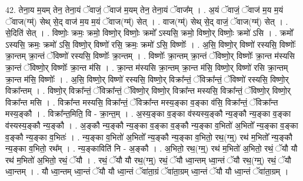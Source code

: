 \documentclass[17pt]{extarticle}
\begin{document}
42. तेना॒य म॒यम् तेन॒ तेना॒यं ॅवाजं॒ ॅवाज॑ म॒यम् तेन॒ तेना॒यं ॅवाज᳚म् । . अ॒यं ॅवाजं॒ ॅवाज॑ म॒य म॒यं ॅवाज(ग्म्॑) सेथ् से॒द् वाज॑ म॒य म॒यं ॅवाज(ग्म्॑) सेत् । . वाज(ग्म्॑) सेथ् से॒द् वाजं॒ ॅवाज(ग्म्॑) सेत् । . से॒दिति॑ सेत् । . विष्णोः॒ क्रमः॒ क्रमो॒ विष्णो॒र् विष्णोः॒ क्रमो᳚ ऽस्यसि॒ क्रमो॒ विष्णो॒र् विष्णोः॒ क्रमो॑ ऽसि । . क्रमो᳚ ऽस्यसि॒ क्रमः॒ क्रमो॑ ऽसि॒ विष्णो॒र् विष्णो॑ रसि॒ क्रमः॒ क्रमो॑ ऽसि॒ विष्णोः᳚ । . अ॒सि॒ विष्णो॒र् विष्णो॑ रस्यसि॒ विष्णोः᳚ क्रा॒न्तम् क्रा॒न्तं ॅविष्णो॑ रस्यसि॒ विष्णोः᳚ क्रा॒न्तम् । . विष्णोः᳚ क्रा॒न्तम् क्रा॒न्तं ॅविष्णो॒र् विष्णोः᳚ क्रा॒न्त म॑स्यसि क्रा॒न्तं ॅविष्णो॒र् विष्णोः᳚ क्रा॒न्त म॑सि । . क्रा॒न्त म॑स्यसि क्रा॒न्तम् क्रा॒न्त म॑सि॒ विष्णो॒र् विष्णो॑ रसि क्रा॒न्तम् क्रा॒न्त म॑सि॒ विष्णोः᳚ । . अ॒सि॒ विष्णो॒र् विष्णो॑ रस्यसि॒ विष्णो॒र् विक्रा᳚न्तं॒ ॅविक्रा᳚न्तं॒ ॅविष्णो॑ रस्यसि॒ विष्णो॒र् विक्रा᳚न्तम् । . विष्णो॒र् विक्रा᳚न्तं॒ ॅविक्रा᳚न्तं॒ ॅविष्णो॒र् विष्णो॒र् विक्रा᳚न्त मस्यसि॒ विक्रा᳚न्तं॒ ॅविष्णो॒र् विष्णो॒र् विक्रा᳚न्त मसि । . विक्रा᳚न्त मस्यसि॒ विक्रा᳚न्तं॒ ॅविक्रा᳚न्त मस्य॒ङ्का व॒ङ्का व॑सि॒ विक्रा᳚न्तं॒ ॅविक्रा᳚न्त मस्य॒ङ्कौ । . विक्रा᳚न्त॒मिति॒ वि - क्रा॒न्त॒म् । . अ॒स्य॒ङ्का व॒ङ्का व॑स्यस्य॒ङ्कौ न्य॒ङ्कौ न्य॒ङ्का व॒ङ्का व॑स्यस्य॒ङ्कौ न्य॒ङ्कौ । . अ॒ङ्कौ न्य॒ङ्कौ न्य॒ङ्का व॒ङ्का व॒ङ्कौ न्य॒ङ्का व॒भितो॑ अ॒भितो᳚ न्य॒ङ्का व॒ङ्का व॒ङ्कौ न्य॒ङ्का व॒भितः॑ । . न्य॒ङ्का व॒भितो॑ अ॒भितो᳚ न्य॒ङ्कौ न्य॒ङ्का व॒भितो॒ रथ॒(ग्म्॒) रथ॑ म॒भितो᳚ न्य॒ङ्कौ न्य॒ङ्का व॒भितो॒ रथ᳚म् । . न्य॒ङ्काविति॑ नि - अ॒ङ्कौ । . अ॒भितो॒ रथ॒(ग्म्॒) रथ॑ म॒भितो॑ अ॒भितो॒ रथं॒ ॅयौ यौ रथ॑ म॒भितो॑ अ॒भितो॒ रथं॒ ॅयौ । . रथं॒ ॅयौ यौ रथ॒(ग्म्॒) रथं॒ ॅयौ ध्वा॒न्तम् ध्वा॒न्तं ॅयौ रथ॒(ग्म्॒) रथं॒ ॅयौ ध्वा॒न्तम् । . यौ ध्वा॒न्तम् ध्वा॒न्तं ॅयौ यौ ध्वा॒न्तं ॅवा॑ता॒ग्रं ॅवा॑ता॒ग्रम् ध्वा॒न्तं ॅयौ यौ ध्वा॒न्तं ॅवा॑ता॒ग्रम् । \newline
\end{document}
